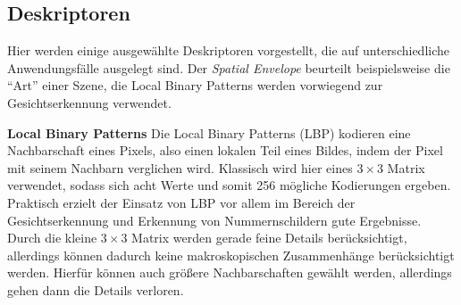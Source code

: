 
\subsection{Deskriptoren}

Hier werden einige ausgewählte Deskriptoren vorgestellt, die auf unterschiedliche Anwendungsfälle ausgelegt sind. Der \textit{Spatial Envelope} beurteilt beispielsweise die \enquote{Art} einer Szene, die Local Binary Patterns werden vorwiegend zur Gesichtserkennung verwendet. \newline

\textbf{Local Binary Patterns} Die Local Binary Patterns (LBP) kodieren eine Nachbarschaft eines Pixels, also einen lokalen Teil eines Bildes, indem der Pixel mit seinem Nachbarn verglichen wird. Klassisch wird hier eines $3 \times 3$ Matrix verwendet, sodass sich acht Werte und somit 256 mögliche Kodierungen ergeben.
Praktisch erzielt der Einsatz von LBP vor allem im Bereich der Gesichtserkennung und Erkennung von Nummernschildern gute Ergebnisse. Durch die kleine $3 \times 3$ Matrix werden gerade feine Details berücksichtigt, allerdings können dadurch keine makroskopischen Zusammenhänge berücksichtigt werden. Hierfür können auch größere Nachbarschaften gewählt werden, allerdings gehen dann die Details verloren.\newline 

